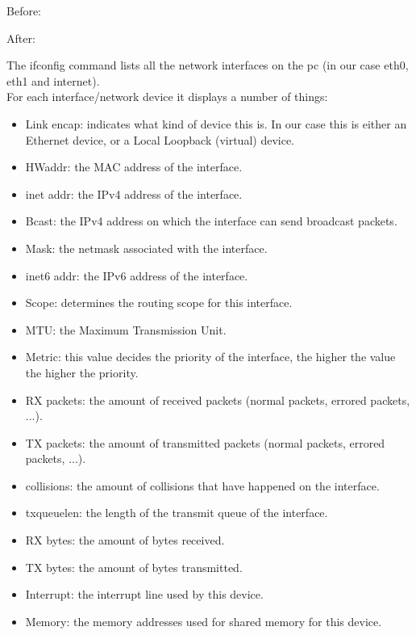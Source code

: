 Before: \newline

After: \newline


The ifconfig command lists all the network interfaces on the pc (in our case eth0, eth1 and internet). \\

For each interface/network device it displays a number of things: \\
\begin{itemize}
	\item Link encap: indicates what kind of device this is. In our case this is either an Ethernet device, or a Local Loopback (virtual) device.
	\item HWaddr: the MAC address of the interface.
	\item inet addr: the IPv4 address of the interface.
	\item Bcast: the IPv4 address on which the interface can send broadcast packets.
	\item Mask: the netmask associated with the interface.
	\item inet6 addr: the IPv6 address of the interface.
	\item Scope: determines the routing scope for this interface. 
	\item MTU: the Maximum Transmission Unit.
	\item Metric: this value decides the priority of the interface, the higher the value the higher the priority.
	\item RX packets: the amount of received packets (normal packets, errored packets, ...).
	\item TX packets: the amount of transmitted packets (normal packets, errored packets, ...).
	\item collisions: the amount of collisions that have happened on the interface.
	\item txqueuelen: the length of the transmit queue of the interface.
	\item RX bytes: the amount of bytes received.
	\item TX bytes: the amount of bytes transmitted.
	\item Interrupt: the interrupt line used by this device.
	\item Memory: the memory addresses used for shared memory for this device.
\end{itemize}